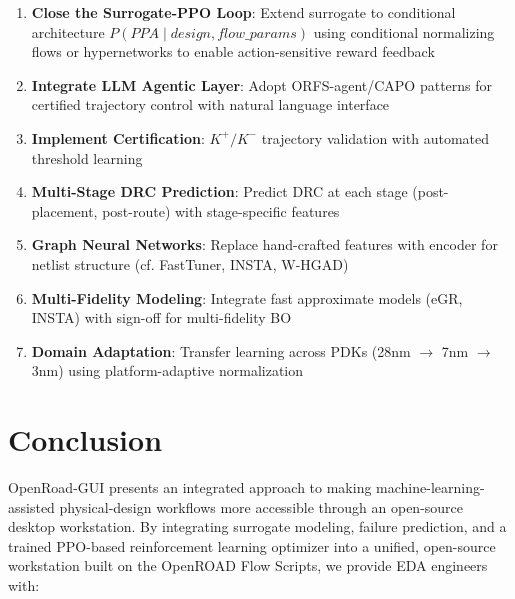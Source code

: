 \documentclass[10pt,conference]{IEEEtran}
\newcommand{\GNN}{\text{GNN}}
\begin{document}
\begin{table}[t]
\begin{enumerate}
    \item \textbf{Close the Surrogate-PPO Loop}: Extend surrogate to conditional architecture $P(PPA \mid design, flow\_params)$ using conditional normalizing flows or hypernetworks to enable action-sensitive reward feedback
    \item \textbf{Integrate LLM Agentic Layer}: Adopt ORFS-agent/CAPO patterns for certified trajectory control with natural language interface
    \item \textbf{Implement Certification}: $K^+/K^-$ trajectory validation with automated threshold learning
    \item \textbf{Multi-Stage DRC Prediction}: Predict DRC at each stage (post-placement, post-route) with stage-specific features
    \item \textbf{Graph Neural Networks}: Replace hand-crafted features with \GNN{} encoder for netlist structure (cf. FastTuner, INSTA, W-HGAD)
    \item \textbf{Multi-Fidelity Modeling}: Integrate fast approximate models (eGR, INSTA) with sign-off for multi-fidelity BO
    \item \textbf{Domain Adaptation}: Transfer learning across PDKs (28nm $\rightarrow$ 7nm $\rightarrow$ 3nm) using platform-adaptive normalization
\end{enumerate}


\section{Conclusion}
\label{sec:conclusion}

OpenRoad-GUI presents an integrated approach to making machine-learning-assisted physical-design workflows more accessible through an open-source desktop workstation. By integrating surrogate modeling, failure prediction, and a trained PPO-based reinforcement learning optimizer into a unified, open-source workstation built on the OpenROAD Flow Scripts, we provide EDA engineers with:


\end{table}
\end{document}
